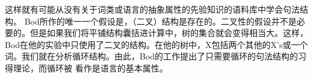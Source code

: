 
这样就有可能从没有关于词类或语言的抽象属性的先验知识的语料库中学会句法结构。
Bod所作的唯一一个假设是，（二叉）结构是存在的。二叉性的假设并不是必要的。但是如果我们将平铺结构囊括进计算中，树的集合就会变得相当大。这样，Bod在他的实验中只使用了二叉的结构。在他的树中，X包括两个其他的X's或一个词。我们就在分析循环结构。由此，Bod的工作提出了只需要循环的句法结构的习得理论，而循环被 \citet*{HCF2002a}看作是语言的基本属性。

